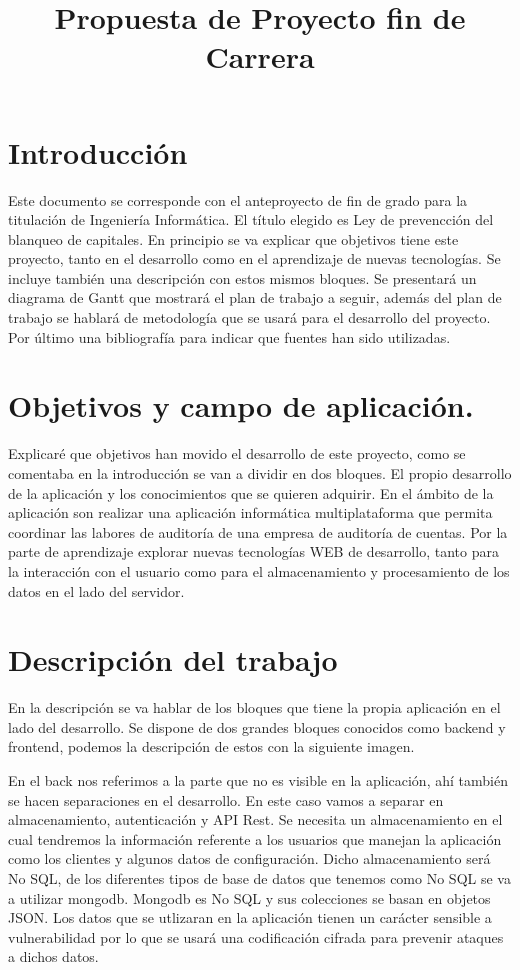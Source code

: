 \documentclass{article}
\begin{document}
\title{Propuesta de Proyecto fin de Carrera}
\setcounter{page}{2}
\cleardoublepage

\setcounter{tocdepth}{2}
\tableofcontents
\listoffixmes



\section{Introducción}
Este documento se corresponde con el anteproyecto de fin de grado para la titulación de Ingeniería Informática. El título elegido es Ley de prevencción del blanqueo de capitales.
En principio se va explicar que objetivos tiene este proyecto, tanto en el desarrollo como en el aprendizaje de nuevas tecnologías. Se incluye también una descripción con estos mismos bloques.
Se presentará un diagrama de Gantt que mostrará el plan de trabajo a seguir, además del plan de trabajo se hablará de metodología que se usará para el desarrollo del proyecto.
Por último una bibliografía para indicar que fuentes han sido utilizadas.  


 


\section{Objetivos y campo de aplicación.}
Explicaré que objetivos han movido el desarrollo de este proyecto, como se comentaba en la introducción se van a dividir en dos bloques. El propio desarrollo de la aplicación y los conocimientos que se quieren adquirir.
En el ámbito de la aplicación son realizar una aplicación informática multiplataforma que permita coordinar las labores de auditoría de una empresa de auditoría de cuentas.
Por la parte de aprendizaje explorar nuevas tecnologías WEB de desarrollo, tanto para la interacción con el usuario como para el almacenamiento y procesamiento de los datos en el lado del servidor.



\section{Descripción del trabajo}
En la descripción se va hablar de los bloques que tiene la propia aplicación en el lado del desarrollo. Se dispone de dos grandes bloques conocidos como backend y frontend, podemos la descripción de estos con la siguiente imagen.

En el back nos referimos a la parte que no es visible en la aplicación, ahí también se hacen separaciones en el desarrollo. En este caso vamos a separar en almacenamiento, autenticación y API Rest.
Se necesita un almacenamiento en el cual tendremos la información referente a los usuarios que manejan la aplicación como los clientes y algunos datos de configuración. Dicho almacenamiento será No SQL, de los diferentes tipos de base de datos que tenemos como No SQL se va a utilizar mongodb. Mongodb es No SQL y sus colecciones se basan en objetos JSON. Los datos que se utlizaran en la aplicación tienen un carácter sensible a vulnerabilidad por lo que se usará una codificación cifrada para prevenir ataques a dichos datos.
\end{document}
